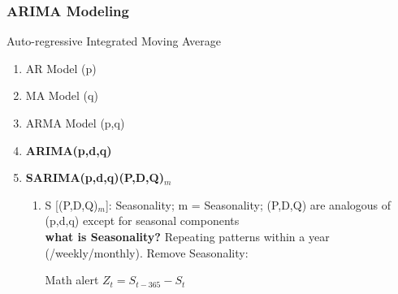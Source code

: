 \documentclass{beamer}
\begin{document}
\begin{frame}[allowframebreaks]\frametitle{ARIMA Modeling}
	Auto-regressive Integrated Moving Average\\
	\begin{enumerate}
		\item AR Model (p)\\
		\item MA Model (q)\\
		\item ARMA Model (p,q)\\
		\item \textbf{ARIMA(p,d,q)}\\	
		\item \textbf{SARIMA(p,d,q)(P,D,Q)$_m$}
		\begin{enumerate}
			\item S [(P,D,Q)$_m$]: Seasonality; m = Seasonality; (P,D,Q) are analogous of (p,d,q) except for seasonal components\\
			\textbf{what is Seasonality?} Repeating patterns within a year (/weekly/monthly). Remove Seasonality:\\
			\begin{alertblock}{Math alert}
				$Z_t = S_{t-365}-S_t$ \\
			\end{alertblock}
	

\end{enumerate}
\end{enumerate}
\end{frame}
\end{document}
